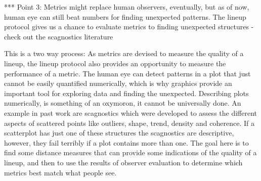 \documentclass[12]{article}
\begin{document}



{\color{red} ***  Point 3: Metrics might replace human observers, eventually, but as of now, human eye can still beat numbers for finding unexpected patterns. The lineup protocol gives us a chance to evaluate metrics to finding unexpected structures - check out the scagnostics literature}

This is a two way process: As metrics are devised to measure the quality of a lineup, the lineup protocol also provides an opportunity to measure the performance of a metric. The human eye can detect patterns in a plot that just cannot be easily quantified numerically, which is why graphics provide an important tool for exploring data and finding the unexpected. Describing plots numerically, is something  of an oxymoron, it cannot be universally done. An example in past work are scagnostics \citep{tukey:1977,wilkinson2005graph} which were developed to assess the different aspects of scattered points like outliers, shape, trend, density and coherence.  If a scatterplot has just one of these structures the scagnostics are descriptive, however, they fail terribly if a plot contains more than one. The goal here is to find some distance measures that can provide some indications of the quality of a lineup, and then to use the results of observer evaluation to determine which metrics best match what people see.
\end{document}

